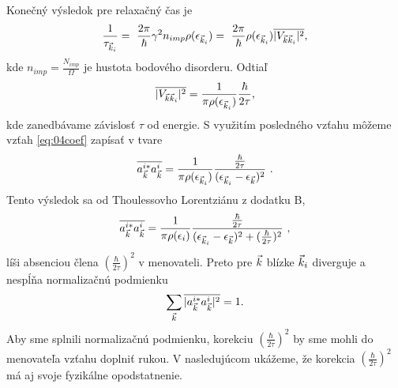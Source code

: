 Konečný výsledok pre relaxačný čas je
\begin{align}
\label{eq:04fgr_final}
\frac{1}{\tau_{\vec{k}_i}}
=\
\frac{2\pi}{\hbar}\gamma^2n_{imp}\rho(\epsilon_{\vec{k}_i})
=\
\frac{2\pi}{\hbar}\rho(\epsilon_{\vec{k}_i})\overline{|V_{\vec{k}\vec{k}_i}|^2}
 \text{,}
\end{align}
kde $n_{imp}=\frac{N_{imp}}{\Omega}$ je hustota bodového disorderu. Odtiaľ
\begin{equation}
\label{maticelement fi}
\overline{|V_{\vec{k}\vec{k}_i}|^2}  = \frac{1}{\pi\rho(\epsilon_{\vec{k}_i})} \frac{\hbar}{2\tau} \text{,}
\end{equation}
kde zanedbávame závislosť $ \tau$ od energie. S využitím posledného vzťahu môžeme vzťah \eqref{eq:04coef} zapísať v tvare
\begin{align}
\label{eq:04divergent}
\overline{a_{\vec{k}}^{i*}a_{\vec{k}}^i}=\frac{1}{\pi\rho(\epsilon_{\vec{k}_i})}
\frac{\frac{\hbar}{2\tau}}{(\epsilon_{\vec{k}_i}-\epsilon_{\vec{k}})^2}
\ \text{.}
\end{align}
Tento výsledok sa od Thoulessovho Lorentziánu z dodatku B,
\begin{align}
\label{eq:04lorenz}
\overline{a_{\vec{k}}^{i*}a_{\vec{k}}^i}=\frac{1}{\pi\rho(\epsilon_i)}
\frac{\frac{\hbar}{2\tau}}
{
(\epsilon_{\vec{k}_i}-\epsilon_{\vec{k}})^2
+ (\frac{\hbar}{2\tau})^2
}
\ \text{,}
\end{align}
líši absenciou člena $(\frac{\hbar}{2\tau})^2$ v menovateli.
Preto pre $\vec{k}$ blízke $\vec{k}_i$  diverguje a nespĺňa normalizačnú podmienku
\begin{align}
\sum_{\vec{k}} \overline{|a_{\vec{k}}^{i*}a_{\vec{k}}^i|^2}=1\text{.}
\end{align}
Aby sme splnili normalizačnú podmienku, korekciu $(\frac{\hbar}{2\tau})^2$ by sme mohli do menovateľa vzťahu \label{eq:04divergent} doplniť rukou.
V nasledujúcom ukážeme, že korekcia $(\frac{\hbar}{2\tau})^2$ má aj svoje fyzikálne opodstatnenie.

